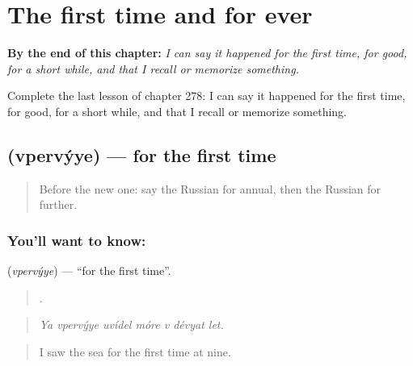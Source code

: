 
\chapter{The first time and for ever}
\label{ch:ru-the-first-time-and-for-ever}

\begin{chapteropening}
\textbf{By the end of this chapter:} \emph{I can say it happened for the first time, for good, for a short while, and that I recall or memorize something.}

Complete the last lesson of chapter 278: I can say it happened for the first time, for good, for a short while, and that I recall or memorize something.
\end{chapteropening}

\section[\texorpdfstring{\ru{впервые} (vpervýye)}{впервые (vpervýye)}]{ (vpervýye) — for the first time}

\label{lesson:RU-C278-vpervyye}



\begin{quote}
Before the new one: say the Russian for annual, then the Russian for further.
\end{quote}

\subsection*{You'll want to know: }
\textbf{} (\emph{vpervýye}) — \textquotedblleft{}for the first time\textquotedblright{}.

\begin{quote}
      .
\end{quote}

\begin{quote}
\emph{Ya vpervýye uvídel móre v dévyat let.}
\end{quote}

\begin{quote}
I saw the sea for the first time at nine.
\end{quote}


